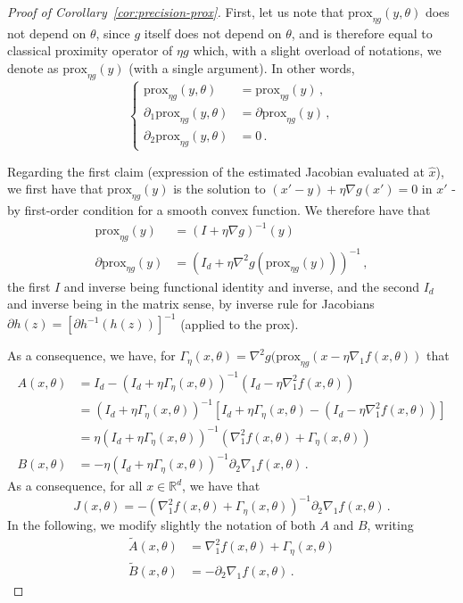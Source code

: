 \documentclass{article}
\def\RR{{\mathbb R}}
\def\prox{{\text{prox}}}
\begin{document}
\begin{proof}[Proof of Corollary~\ref{cor:precision-prox}]
First, let us note that $\prox_{\eta g} (y, \theta)$ does not depend on $\theta$,  since $g$ itself does not depend on $\theta$, and is therefore equal to classical proximity operator of $\eta g$ which, with a slight overload of notations, we denote as $\prox_{\eta g}(y)$ (with a single argument). In other words,
\begin{equation*}
    \begin{cases}
        \prox_{\eta g} (y, \theta) &= \prox_{\eta g} (y)\,,\\
        \partial_1 \prox_{\eta g} (y, \theta) &= \partial\prox_{\eta g} (y)\,,\\
        \partial_2 \prox_{\eta g} (y, \theta) &= 0\,.
    \end{cases}
\end{equation*}

Regarding the first claim (expression of the estimated Jacobian evaluated at $\hat x$), we first have that $\prox_{\eta g} (y)$
 is the solution to $(x' - y) + \eta \nabla g(x') = 0$ in $x'$ - by first-order condition for a smooth convex function. We therefore have that
\begin{align*}
\prox_{\eta g}(y) &= (I + \eta \nabla g)^{-1} (y)\\
\partial \prox_{\eta g}(y) &= (I_d + \eta \nabla^2 g(\prox_{\eta g}(y)))^{-1}\, ,
\end{align*}
the first $I$ and inverse being functional identity and inverse, and the second $I_d$ and inverse being in the matrix sense, by inverse rule for Jacobians $\partial h(z) = [\partial h^{-1}(h(z))]^{-1}$ (applied to the prox).

As a consequence, we have, for $\Gamma_\eta(x, \theta) =  \nabla^2 g(\prox_{\eta g}(x - \eta \nabla_1 f(x, \theta))$ that 
\begin{align*}
A(x, \theta) &= I_d - (I_d + \eta \Gamma_\eta(x, \theta))^{-1}(I_d - \eta \nabla_1^2 f(x, \theta)) \\
&= (I_d + \eta \Gamma_\eta(x, \theta))^{-1} [I_d + \eta \Gamma_\eta(x, \theta) - (I_d - \eta \nabla_1^2 f(x, \theta))] \\
&= \eta (I_d + \eta \Gamma_\eta(x, \theta))^{-1} ( \nabla^2_1 f(x, \theta) +  \Gamma_\eta(x, \theta)) \\
B(x, \theta) &= - \eta  (I_d + \eta \Gamma_\eta(x, \theta))^{-1} \partial_2 \nabla_1 f(x, \theta)\, .
\end{align*}
As a consequence, for all $x \in \RR^d$, we have that
\[
J(x, \theta) = - ( \nabla^2_1 f(x, \theta) +
\Gamma_\eta(x, \theta))^{-1} \partial_2 \nabla_1 f(x, \theta)\, .
\]
In the following, we modify slightly the notation of both $A$ and $B$, writing
\begin{align*}
\tilde A(x, \theta) &= \nabla^2_1 f(x, \theta) + \Gamma_\eta(x, \theta) \\
\tilde B(x, \theta) &= - \partial_2 \nabla_1 f(x, \theta)\, .
\end{align*}


\end{proof}
\end{document}
